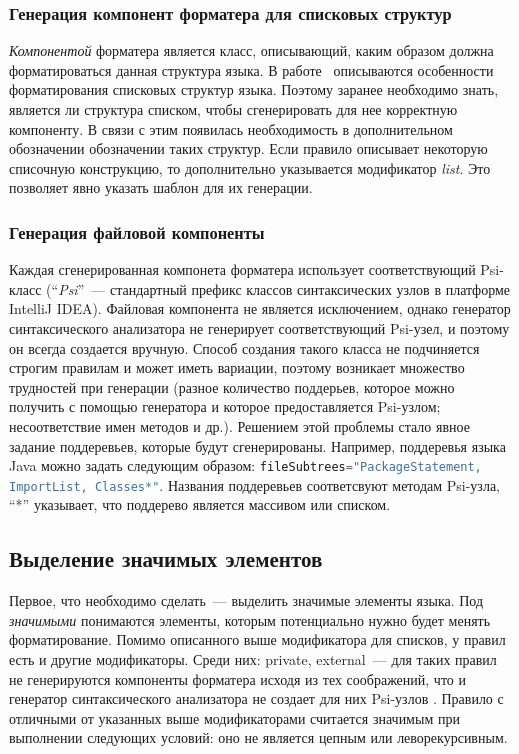 \documentclass[conference]{IEEEtran}
\begin{document}
\subsubsection*{Генерация компонент форматера для списковых структур}
\emph{Компонентой} форматера является класс, описывающий, каким образом должна форматироваться данная структура языка.
В работе~\cite{while} описываются особенности форматирования списковых структур языка.
Поэтому заранее необходимо знать, является ли структура списком, чтобы сгенерировать для нее корректную компоненту.
В связи с этим появилась необходимость в дополнительном обозначении обозначении таких структур.
Если правило описывает некоторую списочную конструкцию, то дополнительно указывается модификатор \emph{list}.
Это позволяет явно указать шаблон для их генерации.

\subsubsection*{Генерация файловой компоненты}
Каждая сгенерированная компонета форматера использует соответствующий Psi-класс (``\emph{Psi}''~--- стандартный префикс классов синтаксических узлов в платформе IntelliJ IDEA).
Файловая компонента не является исключением, однако генератор синтаксического анализатора не генерирует соответствующий Psi-узел, и поэтому он всегда создается вручную.
Способ создания такого класса не подчиняется строгим правилам и может иметь вариации, поэтому возникает множество трудностей при генерации (разное количество поддерьев, которое можно получить с помощью генератора и которое предоставляется Psi-узлом; несоответствие имен методов и др.).
Решением этой проблемы стало явное задание поддеревьев, которые будут сгенерированы.
Например, поддеревья языка Java можно задать следующим образом: \lstinline[language=java]{fileSubtrees="PackageStatement, ImportList, Classes*"}.
Названия поддеревьев соответсвуют методам Psi-узла, ``*'' указывает, что поддерево является массивом или списком.


\subsection{Выделение значимых элементов}
Первое, что необходимо сделать~--- выделить значимые элементы языка. 
Под \emph{значимыми} понимаются элементы, которым потенциально нужно будет менять форматирование.
Помимо описанного выше модификатора для списков, у правил есть и другие модификаторы.
Среди них: private, external~--- для таких правил не генерируются компоненты форматера исходя из тех соображений, что и генератор синтаксического анализатора не создает для них Psi-узлов .
Правило с отличными от указанных выше модификаторами считается значимым при выполнении следующих условий: оно не является цепным или леворекурсивным.
\end{document}
